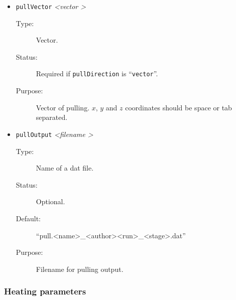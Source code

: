 \documentclass[a4paper]{article}
\begin{document}
\begin{itemize}
\item \texttt{pullVector} \textit{\textless vector \textgreater}
\begin{description}
\item[Type:] Vector.
\item[Status:] Required if \texttt{pullDirection} is ``\texttt{vector}''.
\item[Purpose:] Vector of pulling. $x$, $y$ and $z$ coordinates should be space or tab separated.
\end{description}

\item \texttt{pullOutput} \textit{\textless filename \textgreater}
\begin{description}
\item[Type:] Name of a dat file.
\item[Status:] Optional.
\item[Default:] ``pull.\textless name\textgreater\_\textless author\textgreater\textless run\textgreater\_\textless stage\textgreater.dat''
\item[Purpose:] Filename for pulling output.
\end{description}

\end{itemize} 
   

\subsubsection{Heating parameters}
\label{sec:par.heating}
\end{document}
